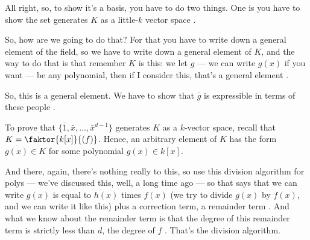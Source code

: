 \begin{proofWrapper}
\begin{speech}[00:05:17 - 00:06:20]
All right, so, to show it's a basis, you have to do two things. One is you have to show the set generates $K$ as a little-$k$ vector space .

So, how are we going to do that? For that you have to write down a general element of the field, so we have to write down a general element of $K$, and the way to do that is that remember $K$ is this: we let $g$ --- we can write $g(x)$ if you want --- be any polynomial, then if I consider this, that's a general element .

So, this is a general element. We have to show that $\bar{g}$ is expressible in terms of these people .
\end{speech}

\begin{content}
To prove that $\{\bar{1}, \bar{x}, \dots, \bar{x}^{d-1}\}$ generates $K$ as a $k$-vector space, recall that $K = \faktor{k[x]}{(f)}$. Hence, an arbitrary element of $K$ has the form $\overline{g(x)} \in K$ for some polynomial $g(x) \in k[x]$.
\end{content}

\begin{hidden}
\end{hidden}

\begin{speech}[00:06:20 - 00:07:57]
And there, again, there's nothing really to this, so use this division algorithm for polys --- we've discussed this, well, a long time ago --- so that says that we can write $g(x)$ is equal to $h(x)$ times $f(x)$ (we try to divide $g(x)$ by $f(x)$, and we can write it like this) plus a correction term, a remainder term . And what we know about the remainder term is that the degree of this remainder term is strictly less than $d$, the degree of $f$ . That's the division algorithm.


\end{speech}
\end{proofWrapper}
